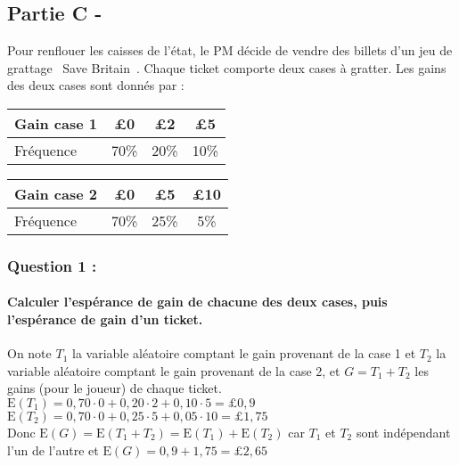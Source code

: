 \documentclass[a4paper, 12pt]{article}
\begin{document}
{}
\subsection*{Partie C -}
Pour renflouer les caisses de l'état, le PM décide de vendre des billets d'un jeu de grattage \guillemotleft\ Save Britain\ \guillemotright. Chaque ticket comporte deux cases à gratter. 
Les gains des deux cases sont donnés par : 
\\

\begin{center}
\begin{tabular}{ |l|c|c|c| }
    \hline
    Gain case 1 & £0 & £2 & £5 \\
    \hline
    Fréquence & 70\% & 20\% & 10\% \\
    \hline
\end{tabular}
\hspace{1cm}
\begin{tabular}{ |l|c|c|c| }
    \hline
    Gain case 2 & £0 & £5 & £10 \\
    \hline
    Fréquence & 70\% & 25\% & 5\% \\
    \hline
\end{tabular}
\end{center}

{}
\subsubsection*{Question 1 :}
\paragraph*{Calculer l'espérance de gain de chacune des deux cases, puis l'espérance de gain d'un ticket.\\[5mm]}

On note $T_1$ la variable aléatoire comptant le gain provenant de la case 1 et $T_2$ la variable aléatoire comptant le gain provenant de la case 2, 
et $G = T_1 + T_2$ les gains (pour le joueur) de chaque ticket.
\\
$\text{E}(T_1) = 0,70 \cdot 0 + 0,20 \cdot 2 + 0,10 \cdot 5 = \pounds 0,9$ \\
$\text{E}(T_2) = 0,70 \cdot 0 + 0,25 \cdot 5 + 0,05 \cdot 10 = \pounds 1,75$ \\
Donc $\text{E}(G) = \text{E}(T_1 + T_2) = \text{E}(T_1) + \text{E}(T_2)$ car $T_1$ et $T_2$ sont indépendant l'un de l'autre et $\text{E}(G) = 0,9 + 1,75 = \pounds 2,65$
\end{document}
